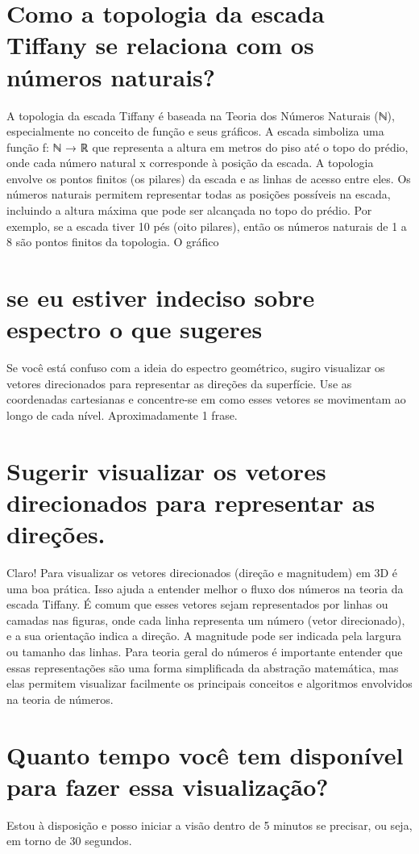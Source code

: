 \documentclass[11pt,a4paper]{article}
\begin{document}
\section{Como a topologia da escada Tiffany se relaciona com os números naturais?}
A topologia da escada Tiffany é baseada na Teoria dos Números Naturais (ℕ), especialmente no conceito de função e seus gráficos. A escada simboliza uma função f: ℕ → ℝ que representa a altura em metros do piso até o topo do prédio, onde cada número natural x corresponde à posição da escada. A topologia envolve os pontos finitos (os pilares) da escada e as linhas de acesso entre eles. Os números naturais permitem representar todas as posições possíveis na escada, incluindo a altura máxima que pode ser alcançada no topo do prédio. Por exemplo, se a escada tiver 10 pés (oito pilares), então os números naturais de 1 a 8 são pontos finitos da topologia. O gráfico

\section{se eu estiver indeciso sobre espectro o que sugeres}
Se você está confuso com a ideia do espectro geométrico, sugiro visualizar os vetores direcionados para representar as direções da superfície. Use as coordenadas cartesianas e concentre-se em como esses vetores se movimentam ao longo de cada nível. Aproximadamente 1 frase.

\section{Sugerir visualizar os vetores direcionados para representar as direções.}
Claro! Para visualizar os vetores direcionados (direção e magnitudem) em 3D é uma boa prática. Isso ajuda a entender melhor o fluxo dos números na teoria da escada Tiffany. É comum que esses vetores sejam representados por linhas ou camadas nas figuras, onde cada linha representa um número (vetor direcionado), e a sua orientação indica a direção. A magnitude pode ser indicada pela largura ou tamanho das linhas. Para teoria geral do números é importante entender que essas representações são uma forma simplificada da abstração matemática, mas elas permitem visualizar facilmente os principais conceitos e algoritmos envolvidos na teoria de números.

\section{Quanto tempo você tem disponível para fazer essa visualização?}
Estou à disposição e posso iniciar a visão dentro de 5 minutos se precisar, ou seja, em torno de 30 segundos.
\end{document}
